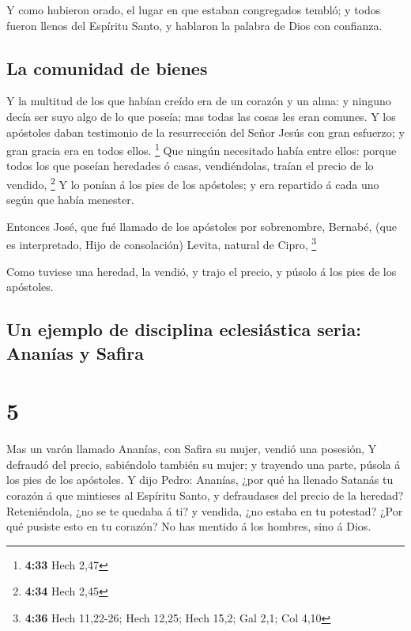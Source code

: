  Y como hubieron orado, el lugar en que estaban congregados
tembló; y todos fueron llenos del Espíritu Santo, y hablaron la palabra
de Dios con confianza.

\hypertarget{la-comunidad-de-bienes}{%
\subsection{La comunidad de bienes}\label{la-comunidad-de-bienes}}

 Y la multitud de los que habían creído era de un corazón y
un alma: y ninguno decía ser suyo algo de lo que poseía; mas todas las
cosas les eran comunes.  Y los apóstoles daban testimonio
de la resurrección del Señor Jesús con gran esfuerzo; y gran gracia era
en todos ellos. \footnote{\textbf{4:33} Hech 2,47}  Que
ningún necesitado había entre ellos: porque todos los que poseían
heredades ó casas, vendiéndolas, traían el precio de lo vendido,
\footnote{\textbf{4:34} Hech 2,45}  Y lo ponían á los pies
de los apóstoles; y era repartido á cada uno según que había menester.

 Entonces José, que fué llamado de los apóstoles por
sobrenombre, Bernabé, (que es interpretado, Hijo de consolación) Levita,
natural de Cipro, \footnote{\textbf{4:36} Hech 11,22-26; Hech 12,25;
  Hech 15,2; Gal 2,1; Col 4,10}

 Como tuviese una heredad, la vendió, y trajo el precio, y
púsolo á los pies de los apóstoles.

\hypertarget{un-ejemplo-de-disciplina-eclesiuxe1stica-seria-ananuxedas-y-safira}{%
\subsection{Un ejemplo de disciplina eclesiástica seria: Ananías y
Safira}\label{un-ejemplo-de-disciplina-eclesiuxe1stica-seria-ananuxedas-y-safira}}

\hypertarget{section-4}{%
\section{5}\label{section-4}}

 Mas un varón llamado Ananías, con Safira su mujer, vendió
una posesión,  Y defraudó del precio, sabiéndolo también su
mujer; y trayendo una parte, púsola á los pies de los apóstoles.
 Y dijo Pedro: Ananías, ¿por qué ha llenado Satanás tu
corazón á que mintieses al Espíritu Santo, y defraudases del precio de
la heredad?  Reteniéndola, ¿no se te quedaba á ti? y
vendida, ¿no estaba en tu potestad? ¿Por qué pusiste esto en tu corazón?
No has mentido á los hombres, sino á Dios.


